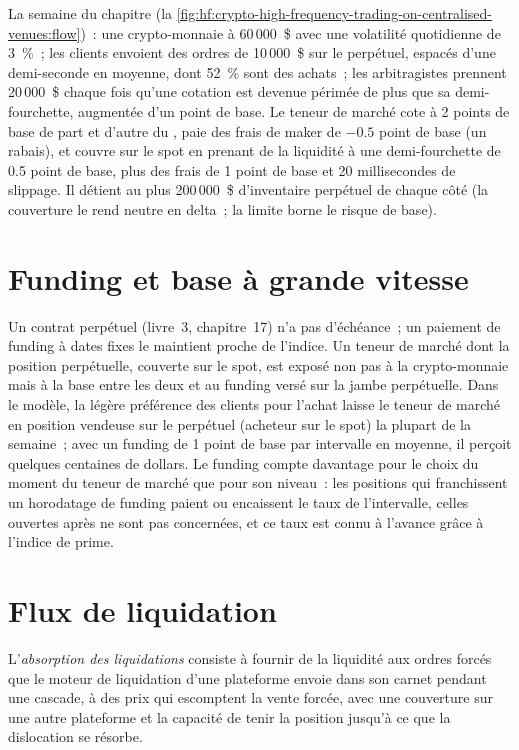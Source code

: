 La semaine du chapitre (la \cref{fig:hf:crypto-high-frequency-trading-on-centralised-venues:flow})~: une crypto-monnaie à 60\,000~\$ avec une volatilité quotidienne de 3~\%~; les clients
envoient des ordres de 10\,000~\$ sur le perpétuel, espacés d'une demi-seconde en moyenne, dont 52~\% sont des achats~; les arbitragistes prennent 20\,000~\$ chaque fois qu'une cotation est devenue périmée
de plus que sa demi-fourchette, augmentée d'un point de base. Le teneur de marché cote à 2 points de base de part et d'autre du , paie des frais de maker de $-0.5$
point de base (un rabais), et couvre sur le spot en prenant de la liquidité à une demi-fourchette de 0.5 point de base, plus des frais de 1 point de base et 20 millisecondes de slippage. Il détient
au plus 200\,000~\$ d'inventaire perpétuel de chaque côté (la couverture le rend neutre en delta~; la limite borne le risque de base).

\section{Funding et base à grande vitesse}

Un contrat perpétuel (livre~3, chapitre~17) n'a pas d'échéance~; un paiement de funding à dates fixes le maintient proche de l'indice. Un teneur de marché dont
la position perpétuelle, couverte sur le spot, est exposé non pas à la crypto-monnaie mais à la base entre les deux et au funding versé sur la jambe perpétuelle. Dans le
modèle, la légère préférence des clients pour l'achat laisse le teneur de marché en position vendeuse sur le perpétuel (acheteur sur le spot) la plupart de la semaine~; avec un funding de 1 point de base
par intervalle en moyenne, il perçoit quelques centaines de dollars. Le funding compte davantage pour le choix du moment du teneur de marché que pour son niveau~: les positions qui franchissent
un horodatage de funding paient ou encaissent le taux de l'intervalle, celles ouvertes après ne sont pas concernées, et ce taux est connu à l'avance grâce à l'indice de prime.

\section{Flux de liquidation}

\begin{definition}\label{def:hf:crypto-high-frequency-trading-on-centralised-venues:absorb}
L'\emph{absorption des liquidations} consiste à fournir de la liquidité aux ordres forcés que le moteur de liquidation d'une plateforme envoie dans son
carnet pendant une cascade, à des prix qui escomptent la vente forcée, avec une couverture sur une autre plateforme et la capacité de tenir la position jusqu'à ce que la
dislocation se résorbe.
\end{definition}

